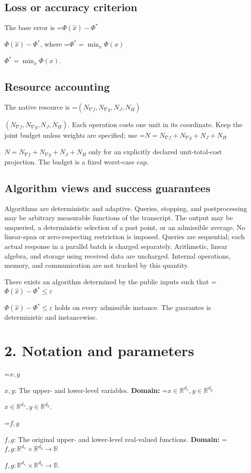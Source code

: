 \documentclass[10pt,a4paper]{article}
\newcommand{\AtlasMath}[1]{\par\begingroup\centering\setbox0=\hbox{$\displaystyle #1$}\ifdim\wd0>1.4\linewidth\typeout{ATLAS WIDE FORMULA: \the\wd0}\fi\ifdim\wd0>\linewidth\resizebox{\linewidth}{!}{\box0}\else\box0\fi\par\endgroup}
\newcommand{\AtlasInlineMath}[1]{\begingroup\setbox0=\hbox{$#1$}\ifdim\wd0>.4\linewidth\endgroup\AtlasMath{#1}\else\endgroup$#1$\fi}
\begin{document}
\subsection{Loss or accuracy criterion}
The base error is \AtlasInlineMath{\Phi(\widehat{x})-\Phi^*}, where \AtlasInlineMath{\Phi^*=\min_x\Phi(x)}.

\subsection{Resource accounting}
The native resource is \AtlasInlineMath{(N_{\nabla f},N_{\nabla g},N_J,N_H)}. Each operation costs one unit in its coordinate. Keep the joint budget unless weights are specified; use \AtlasInlineMath{N=N_{\nabla f}+N_{\nabla g}+N_J+N_H} only for an explicitly declared unit-total-cost projection. The budget is a fixed worst-case cap.

\subsection{Algorithm views and success guarantees}
Algorithms are deterministic and adaptive. Queries, stopping, and postprocessing may be arbitrary measurable functions of the transcript. The output may be unqueried, a deterministic selection of a past point, or an admissible average. No linear-span or zero-respecting restriction is imposed. Queries are sequential; each actual response in a parallel batch is charged separately. Arithmetic, linear algebra, and storage using received data are uncharged. Internal operations, memory, and communication are not tracked by this quantity.

There exists an algorithm determined by the public inputs such that \AtlasInlineMath{\Phi(\widehat{x})-\Phi^*\le\varepsilon} holds on every admissible instance. The guarantee is deterministic and instancewise.

\section{2. Notation and parameters}
\AtlasInlineMath{x,y}: The upper- and lower-level variables. \textbf{Domain:} \AtlasInlineMath{x\in\mathbb R^{d_x},y\in\mathbb R^{d_y}}.

\AtlasInlineMath{f,g}: The original upper- and lower-level real-valued functions. \textbf{Domain:} \AtlasInlineMath{f,g:\mathbb R^{d_x}\times\mathbb R^{d_y}\to\mathbb R}.
\end{document}
